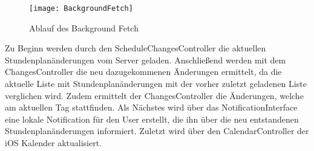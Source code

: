 \begin{figure}[htb]
    \centering
    \texttt{[image: BackgroundFetch]}
    \caption{Ablauf des Background Fetch}
\end{figure}

Zu Beginn werden durch den ScheduleChangesController die aktuellen Stundenplanänderungen vom Server geladen. 
Anschließend werden mit dem ChangesController die neu dazugekommenen Änderungen ermittelt, da die aktuelle Liste mit Stundenplanänderungen mit der vorher zuletzt geladenen Liste verglichen wird. Zudem ermittelt der ChangesController die Änderungen, welche am aktuellen Tag stattfinden. 
Als Nächstes wird über das NotificationInterface eine lokale Notification für den User erstellt, die ihn über die neu entstandenen Stundenplanänderungen informiert.
Zuletzt wird über den CalendarController der iOS Kalender aktualisiert.
